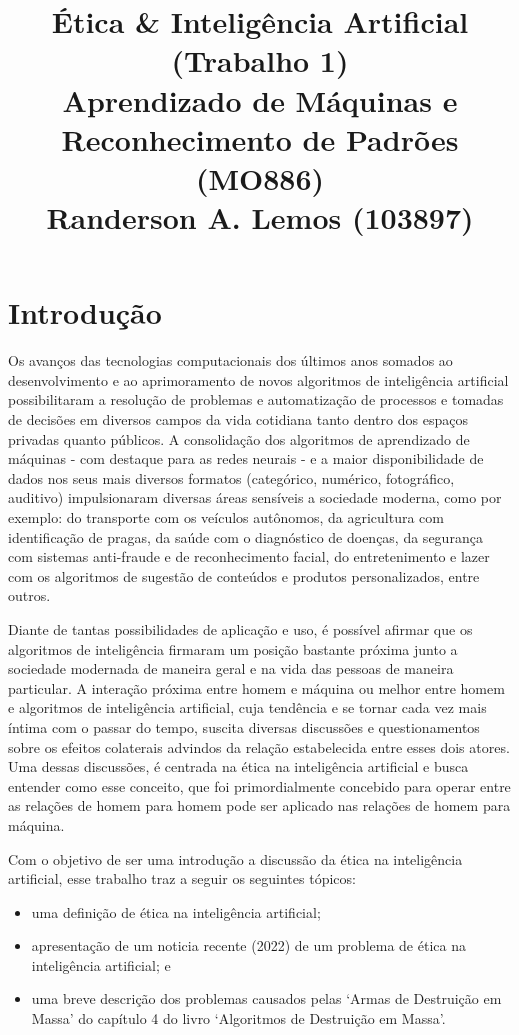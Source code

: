 \documentclass{article}
\title{
	Ética \& Inteligência Artificial (Trabalho 1) \\
	\Large Aprendizado de Máquinas e Reconhecimento de Padrões (MO886) \\
	Randerson A. Lemos (103897)
}
\date{\vspace{-5ex}}
\begin{document}
  \maketitle

%
\section{Introdução}

Os avanços das tecnologias computacionais dos últimos anos somados ao desenvolvimento e ao aprimoramento de novos algoritmos de inteligência artificial possibilitaram a resolução de problemas e automatização de processos e tomadas de decisões em diversos campos da vida cotidiana tanto dentro dos espaços privadas quanto públicos. A consolidação dos algoritmos de aprendizado de máquinas - com destaque para as redes neurais - e a maior disponibilidade de dados nos seus mais diversos formatos (categórico, numérico, fotográfico, auditivo) impulsionaram diversas áreas sensíveis a sociedade moderna, como por exemplo: do transporte com os veículos autônomos, da agricultura com identificação de pragas, da saúde com o diagnóstico de doenças, da segurança com sistemas anti-fraude e de reconhecimento facial, do entretenimento e lazer com os algoritmos de sugestão de conteúdos e produtos personalizados, entre outros.

Diante de tantas possibilidades de aplicação e uso, é possível afirmar que os algoritmos de inteligência firmaram um posição bastante próxima junto a sociedade modernada de maneira geral e na vida das pessoas de maneira particular. A interação próxima entre homem e máquina ou melhor entre homem e algoritmos de inteligência artificial, cuja tendência e se tornar cada vez mais íntima com o passar do tempo, suscita diversas discussões e questionamentos sobre os efeitos colaterais advindos da relação estabelecida entre esses dois atores. Uma dessas discussões, é centrada na ética na inteligência artificial e busca entender como esse conceito, que foi primordialmente concebido para operar entre as relações de homem para homem pode ser aplicado nas relações de homem para máquina. 

Com o objetivo de ser uma introdução a discussão da ética na inteligência artificial, esse trabalho traz a seguir os seguintes tópicos:
\begin{itemize}
	\item uma definição de ética na inteligência artificial;
	\item apresentação de um noticia recente (2022) de um problema de ética na inteligência artificial; e
	\item uma breve descrição dos problemas causados pelas `Armas de Destruição em Massa' do capítulo 4 do livro `Algoritmos de Destruição em Massa'.
\end{itemize}
\end{document}
